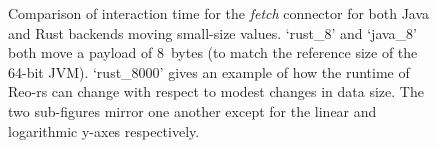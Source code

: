 \begin{figure}
	\centering
	\caption[Java vs.\ Rust interaction time for small values.]{Comparison of interaction time for the \textit{fetch} connector for both Java and Rust backends moving small-size values. `rust\_8' and `java\_8' both move a payload of 8~bytes (to match the reference size of the 64-bit JVM). `rust\_8000' gives an example of how the runtime of Reo-rs can change with respect to modest changes in data size. The two sub-figures mirror one another except for the linear and logarithmic y-axes respectively.}
	\label{fig:rust_v_java}
\end{figure}

